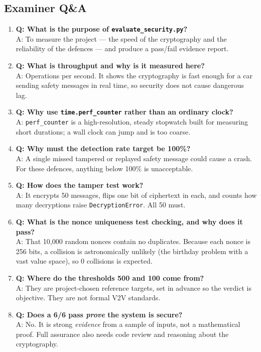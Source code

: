 \documentclass[11pt,a4paper]{article}
\begin{document}
\subsection{Examiner Q\&A}
\begin{enumerate}
  \item \textbf{Q: What is the purpose of \texttt{evaluate\_security.py}?}\\
        A: To measure the project --- the speed of the cryptography and the
        reliability of the defences --- and produce a pass/fail evidence report.
  \item \textbf{Q: What is throughput and why is it measured here?}\\
        A: Operations per second. It shows the cryptography is fast enough for a
        car sending safety messages in real time, so security does not cause
        dangerous lag.
  \item \textbf{Q: Why use \texttt{time.perf\_counter} rather than an ordinary clock?}\\
        A: \texttt{perf\_counter} is a high-resolution, steady stopwatch built
        for measuring short durations; a wall clock can jump and is too coarse.
  \item \textbf{Q: Why must the detection rate target be 100\%?}\\
        A: A single missed tampered or replayed safety message could cause a
        crash. For these defences, anything below 100\% is unacceptable.
  \item \textbf{Q: How does the tamper test work?}\\
        A: It encrypts 50 messages, flips one bit of ciphertext in each, and
        counts how many decryptions raise \texttt{DecryptionError}. All 50 must.
  \item \textbf{Q: What is the nonce uniqueness test checking, and why does it
        pass?}\\
        A: That 10{,}000 random nonces contain no duplicates. Because each nonce
        is 256 bits, a collision is astronomically unlikely (the birthday problem
        with a vast value space), so 0 collisions is expected.
  \item \textbf{Q: Where do the thresholds 500 and 100 come from?}\\
        A: They are project-chosen reference targets, set in advance so the
        verdict is objective. They are not formal V2V standards.
  \item \textbf{Q: Does a 6/6 pass \emph{prove} the system is secure?}\\
        A: No. It is strong \emph{evidence} from a sample of inputs, not a
        mathematical proof. Full assurance also needs code review and reasoning
        about the cryptography.
\end{enumerate}
\end{document}
